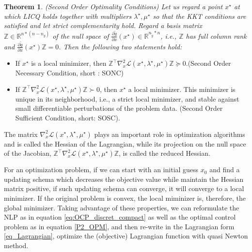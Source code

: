 \documentclass  [
  paper    = a4,
  BCOR     = 10mm,
  twoside,
  fontsize = 12pt,
  fleqn,
  toc      = bibnumbered,
  toc      = listofnumbered,
  numbers  = noendperiod,
  headings = normal,
  listof   = leveldown,
  version  = 3.03
]                                       {scrreprt}
\newcommand{\<}{\langle}
\renewcommand{\>}{\rangle}
\newtheorem{theorem}{Theorem}
\begin{document}
\begin{theorem}(Second Order Optimality Conditions) Let us regard a point $x^\star$ at which LICQ holds together with
	multipliers $\lambda^\star, \mu^\star$ so that the KKT conditions are satisfied and let strict complementarity hold. Regard a basis matrix $\mathbb{Z} \in  \mathbb{R}^{n*(n-n_g)}$ of the null space of $\frac{\partial \tilde{g}}{\partial x} (x^\star) \in \mathbb{R}^{n_{\tilde{g}} *n}$, i.e., $\mathbb{Z}$ has full column rank and $\frac{\partial \tilde{g}}{\partial x} (x^\star)\mathbb{Z} =0$. Then the following two statements hold:
\end{theorem}
\begin{itemize}
	\item  If $x^\star$ is a local minimizer, then $\mathbb{Z}^\top \nabla_x^2 \mathcal{L}(x^\star, \lambda^\star, \mu^\star)\mathbb{Z} \succeq 0  $.(Second Order Necessary Condition, short : SONC)
	\item  If $\mathbb{Z}^\top \nabla_x^2 \mathcal{L}(x^\star, \lambda^\star, \mu^\star)\mathbb{Z} \succ 0 $, then $x^\star$ a local minimizer. This minimizer is unique in its neighborhood, i.e., a strict local minimizer, and stable against small differentiable perturbations of the problem data. (Second Order Sufficient Condition, short: SOSC).
\end{itemize}


The matrix $\nabla_x^2 \mathcal{L}(x^\star, \lambda^\star, \mu^\star)$ plays an important role in optimization algorithms and is called the Hessian of the Lagrangian, while its projection on the null space of the Jacobian, $\mathbb{Z}^\top \nabla_x^2 \mathcal{L}(x^\star, \lambda^\star, \mu^\star)\mathbb{Z}$, is called the reduced Hessian. 

For an optimization problem, if we can start with an initial guess $x_0$ and find a updating schema which decreases the objective value while maintain the Hessian matrix positive, if such updating schema can converge, it will converge to a local minimizer. If the original problem is convex, the local miminizer is, therefore, the global minimizer. Taking advantage of these properties, we can reformulate the NLP as in equation \ref{eq:OCP_discret_compact} as well as the optimal control problem as in equation \ref{P2_OPM}, and then re-write in the Lagrangian form \ref{eq_Lagrangian}, optimize the (objective) Lagrangian function with quasi Newton method. 


\end{document}
